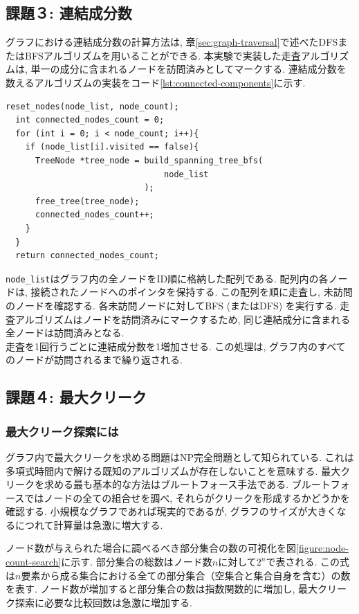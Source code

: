 \documentclass[a4j, 12pt]{jarticle}
\begin{document}
\subsection{課題３: 連結成分数}
グラフにおける連結成分数の計算方法は, 章\ref{sec:graph-traversal}で述べたDFSまたはBFSアルゴリズムを用いることができる. 本実験で実装した走査アルゴリズムは, 単一の成分に含まれるノードを訪問済みとしてマークする.  
連結成分数を数えるアルゴリズムの実装をコード\ref{lst:connected-components}に示す.

\begin{lstlisting}[caption=連結成分数の計算,label=lst:connected-components]
  reset_nodes(node_list, node_count);
  int connected_nodes_count = 0;
  for (int i = 0; i < node_count; i++){
    if (node_list[i].visited == false){
      TreeNode *tree_node = build_spanning_tree_bfs(
                                node_list
                            );
      free_tree(tree_node);
      connected_nodes_count++;
    }
  }
  return connected_nodes_count;
\end{lstlisting}

\texttt{node\_list}はグラフ内の全ノードをID順に格納した配列である. 配列内の各ノードは, 接続されたノードへのポインタを保持する. この配列を順に走査し, 未訪問のノードを確認する. 各未訪問ノードに対してBFS (またはDFS) を実行する. 走査アルゴリズムはノードを訪問済みにマークするため, 同じ連結成分に含まれる全ノードは訪問済みとなる.\\
走査を1回行うごとに連結成分数を1増加させる. この処理は, グラフ内のすべてのノードが訪問されるまで繰り返される.


\subsection{課題４: 最大クリーク}
\subsubsection{最大クリーク探索には}\label{sec:clique-search-problem}
グラフ内で最大クリークを求める問題はNP完全問題として知られている. これは多項式時間内で解ける既知のアルゴリズムが存在しないことを意味する. 最大クリークを求める最も基本的な方法はブルートフォース手法である. ブルートフォースではノードの全ての組合せを調べ, それらがクリークを形成するかどうかを確認する. 小規模なグラフであれば現実的であるが, グラフのサイズが大きくなるにつれて計算量は急激に増大する.

ノード数が与えられた場合に調べるべき部分集合の数の可視化を図\ref{figure:node-count-search}に示す. 部分集合の総数はノード数$n$に対して$2^n$で表される. この式は$n$要素から成る集合における全ての部分集合（空集合と集合自身を含む）の数を表す. ノード数が増加すると部分集合の数は指数関数的に増加し, 最大クリーク探索に必要な比較回数は急激に増加する\cite{rosen2019discrete}.
\end{document}

